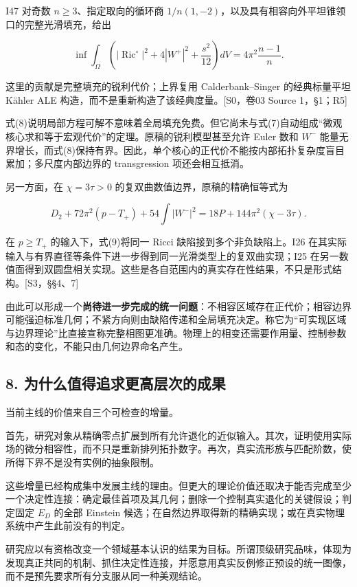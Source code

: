 \documentclass[UTF8,a4paper,11pt,fontset=fandol]{ctexart}
\begin{document}
I47 对奇数 \(n\ge3\)、指定取向的循环商
\(1/n(1,-2)\)，以及具有相容向外平坦锥领口的完整光滑填充，给出

\[
\boxed{
\inf\int_\Omega
\left(|\operatorname{Ric}^{\circ}|^2+4|W^+|^2+\frac{s^2}{12}\right)dV
=4\pi^2\frac{n-1}{n}.
}
\tag{8}
\]

这里的贡献是完整填充的锐利代价；上界复用 Calderbank--Singer
的经典标量平坦 Kähler ALE 构造，而不是重新构造了该经典度量。{[}S0，卷03
Source 1，§1；R5{]}

式(8)说明局部方程可解不意味着全局填充免费。但它尚未与式(7)自动组成``微观核心求和等于宏观代价''的定理。原稿的锐利模型甚至允许
Euler 数和 \(W^-\)
能量无界增长，而式(8)保持有界。因此，单个核心的正代价不能按内部拓扑复杂度盲目累加；多尺度内部边界的
transgression 项还会相互抵消。

另一方面，在 \(\chi=3\tau>0\) 的复双曲数值边界，原稿的精确恒等式为

\[
\boxed{
D_2+72\pi^2(p-T_+)+54\int|W^-|^2
=18P+144\pi^2(\chi-3\tau).
}
\tag{9}
\]

在 \(p\ge T_+\) 的输入下，式(9)将同一 Ricci 缺陷接到多个非负缺陷上。I26
在其实际输入与有界直径等条件下进一步得到同一光滑类型上的复双曲实现；I25
在另一数值面得到双圆盘相关实现。这些是各自范围内的真实存在性结果，不只是形式结构。{[}S3，§§4、7{]}

由此可以形成一个\textbf{尚待进一步完成的统一问题}：不相容区域存在正代价；相容边界可能强迫标准几何；不紧方向则由缺陷传递和全局填充决定。称它为``可实现区域与边界理论''比直接宣称完整相图更准确。物理上的相变还需要作用量、控制参数和态的变化，不能只由几何边界命名产生。

\subsection{8.
为什么值得追求更高层次的成果}\label{ux4e3aux4ec0ux4e48ux503cux5f97ux8ffdux6c42ux66f4ux9ad8ux5c42ux6b21ux7684ux6210ux679c}

当前主线的价值来自三个可检查的增量。

首先，研究对象从精确零点扩展到所有允许退化的近似输入。其次，证明使用实际场的微分相容性，而不只是重新排列拓扑数字。再次，真实流形族与匹配阶数，使所得下界不是没有实例的抽象限制。

这些增量已经构成集中发展主线的理由。但更大的理论价值还取决于能否完成至少一个决定性连接：确定最佳首项及其几何；删除一个控制真实退化的关键假设；判定固定
\(E_D\) 的全部 Einstein
候选；在自然边界取得新的精确实现；或在真实物理系统中产生此前没有的判定。

研究应以有资格改变一个领域基本认识的结果为目标。所谓顶级研究品味，体现为发现真正共同的机制、抓住决定性连接，并愿意用真实反例修正预设的统一图像，而不是预先要求所有分支服从同一种美观结论。
\end{document}
